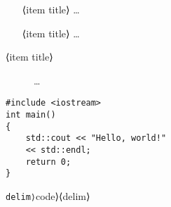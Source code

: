 \documentclass{ctexart}
\begin{document}


\begin{enumerate}
\item[⟨item title⟩] …
\end{enumerate}


\begin{itemize}
\item[⟨item title⟩] …
\end{itemize}

\begin{description}
\item[⟨item title⟩] …
\end{description}

\begin{flushleft}
\end{flushleft}

\begin{flushright}
\end{flushright}

\begin{center}
\end{center}

\begin{quote}
\end{quote}

\begin{quotation}
\end{quotation}

\begin{verse}
\end{verse}

\begin{abstract}
\end{abstract}


\begin{verbatim}
#include <iostream>
int main()
{
    std::cout << "Hello, world!"
    << std::endl;
    return 0;
}
\end{verbatim}
\verb⟨delim⟩⟨code⟩⟨delim⟩
\end{document}
